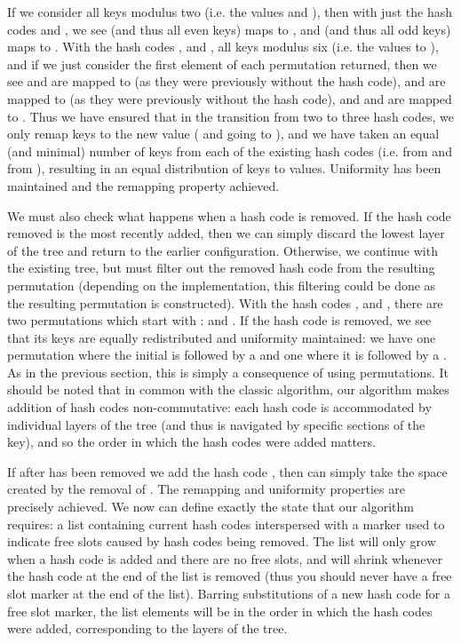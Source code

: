\documentclass[runningheads,a4paper]{llncs}
\begin{document}
If we consider all keys modulus two (i.e. the values  and ),
then with just the hash codes  and , we see  (and
thus all even keys) maps to , and  (and thus all
odd keys) maps to . With the hash codes ,
 and , all keys modulus six (i.e. the values  to
), and if we just consider the first element of each permutation
returned, then we see  and  are mapped to  (as they were
previously without the  hash code),  and  are mapped to
 (as they were previously without the  hash code), and
 and  are mapped to . Thus we have ensured that in the
transition from two to three hash codes, we only remap keys to the new
value ( and  going to ), and we have taken an equal (and
minimal) number of keys from each of the existing hash codes (i.e. 
from  and  from ), resulting in an equal
distribution of keys to values. Uniformity has been maintained and the
remapping property achieved.

We must also check what happens when a hash code is removed. If the
hash code removed is the most recently added, then we can simply
discard the lowest layer of the tree and return to the earlier
configuration. Otherwise, we continue with the existing tree, but must
filter out the removed hash code from the resulting permutation
(depending on the implementation, this filtering could be done as the
resulting permutation is constructed). With the hash codes ,
 and , there are two permutations which start with
:  and . If the
 hash code is removed, we see that its keys are equally
redistributed and uniformity maintained: we have one permutation where
the initial  is followed by a  and one where it is
followed by a . As in the previous section, this is simply a
consequence of using permutations. It should be noted that in common
with the classic algorithm, our algorithm makes addition of hash codes
non-commutative: each hash code is accommodated by individual layers
of the tree (and thus is navigated by specific sections of the key),
and so the order in which the hash codes were added matters.

If after  has been removed we add the hash code , then
 can simply take the space created by the removal of
. The remapping and uniformity properties are precisely
achieved. We now can define exactly the state that our algorithm
requires: a list containing current hash codes interspersed with a
marker used to indicate free slots caused by hash codes being
removed. The list will only grow when a hash code is added and there
are no free slots, and will shrink whenever the hash code at the end
of the list is removed (thus you should never have a free slot marker
at the end of the list). Barring substitutions of a new hash code for
a free slot marker, the list elements will be in the order in which
the hash codes were added, corresponding to the layers of the tree.
\end{document}
